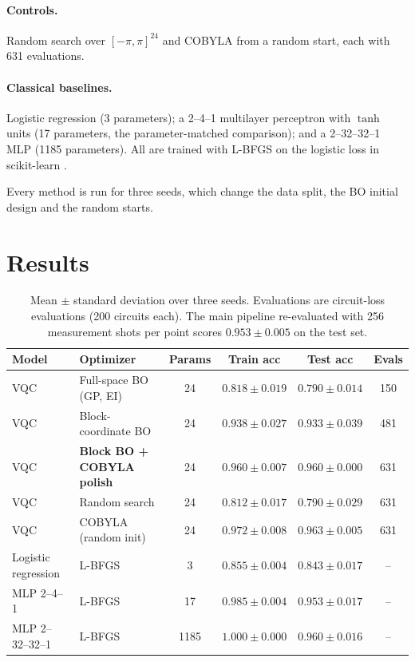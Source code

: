 \documentclass[10pt,twocolumn]{article}
\begin{document}
\paragraph{Controls.} Random search over $[-\pi,\pi]^{24}$ and COBYLA from a random
start, each with 631 evaluations.

\paragraph{Classical baselines.} Logistic regression (3 parameters); a 2--4--1
multilayer perceptron with $\tanh$ units (17 parameters, the parameter-matched
comparison); and a 2--32--32--1 MLP (1185 parameters). All are trained with L-BFGS on
the logistic loss in scikit-learn \citep{sklearn}.

Every method is run for three seeds, which change the data split, the BO initial
design and the random starts.

\section{Results}

\begin{table}[t]
  \centering
  \caption{Mean $\pm$ standard deviation over three seeds. Evaluations are
  circuit-loss evaluations (200 circuits each). The main pipeline re-evaluated
  with 256 measurement shots per point scores $0.953\pm0.005$ on the test set.}
  \label{tab:results}
  \begin{tabular}{llcccc}
    \toprule
    Model & Optimizer & Params & Train acc & Test acc & Evals \\
    \midrule
    VQC & Full-space BO (GP, EI)          & 24 & $0.818\pm0.019$ & $0.790\pm0.014$ & 150 \\
    VQC & Block-coordinate BO              & 24 & $0.938\pm0.027$ & $0.933\pm0.039$ & 481 \\
    VQC & \textbf{Block BO + COBYLA polish} & 24 & $0.960\pm0.007$ & $\mathbf{0.960\pm0.000}$ & 631 \\
    VQC & Random search                    & 24 & $0.812\pm0.017$ & $0.790\pm0.029$ & 631 \\
    VQC & COBYLA (random init)             & 24 & $0.972\pm0.008$ & $0.963\pm0.005$ & 631 \\
    \midrule
    Logistic regression & L-BFGS           & 3    & $0.855\pm0.004$ & $0.843\pm0.017$ & -- \\
    MLP 2--4--1         & L-BFGS           & 17   & $0.985\pm0.004$ & $0.953\pm0.017$ & -- \\
    MLP 2--32--32--1    & L-BFGS           & 1185 & $1.000\pm0.000$ & $0.960\pm0.016$ & -- \\
    \bottomrule
  \end{tabular}
\end{table}
\end{document}
